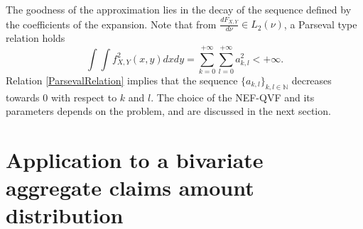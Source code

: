 The goodness of the approximation lies in the decay of the sequence defined by the coefficients of the expansion. Note that from $\frac{dF_{X,Y}}{d\nu}\in L_{2}(\nu)$, a Parseval type relation holds
\begin{equation}\label{ParsevalRelation}
\int\int f_{X,Y}^{2}(x,y)dxdy = \sum_{k=0}^{+\infty}\sum_{l=0}^{+\infty}a_{k,l}^{2}<+\infty.
\end{equation}
Relation \eqref{ParsevalRelation} implies that the sequence $\{a_{k,l}\}_{k,l\in\mathbb{N}}$ decreases towards 0 with respect to $k$ and $l$. The choice of the NEF-QVF and its parameters depends on the problem, and are discussed in the next section.
\section{Application to a bivariate aggregate claims amount distribution}
